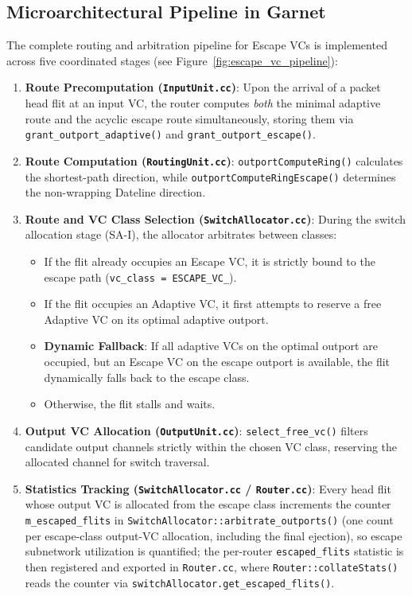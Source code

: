 \documentclass[10pt,journal,compsoc]{IEEEtran}
\begin{document}
\subsection{Microarchitectural Pipeline in Garnet}
The complete routing and arbitration pipeline for Escape VCs is implemented across five coordinated stages (see Figure~\ref{fig:escape_vc_pipeline}):

\begin{enumerate}
    \item \textbf{Route Precomputation (\texttt{InputUnit.cc})}:
    Upon the arrival of a packet head flit at an input VC, the router computes \textit{both} the minimal adaptive route and the acyclic escape route simultaneously, storing them via \texttt{grant\_outport\_adaptive()} and \texttt{grant\_outport\_escape()}.
    
    \item \textbf{Route Computation (\texttt{RoutingUnit.cc})}:
    \texttt{outportComputeRing()} calculates the shortest-path direction, while \texttt{outportComputeRingEscape()} determines the non-wrapping Dateline direction.
    
    \item \textbf{Route and VC Class Selection (\texttt{SwitchAllocator.cc})}:
    During the switch allocation stage (SA-I), the allocator arbitrates between classes:
    \begin{itemize}
        \item If the flit already occupies an Escape VC, it is strictly bound to the escape path (\texttt{vc\_class = ESCAPE\_VC\_}).
        \item If the flit occupies an Adaptive VC, it first attempts to reserve a free Adaptive VC on its optimal adaptive outport.
        \item \textbf{Dynamic Fallback}: If all adaptive VCs on the optimal outport are occupied, but an Escape VC on the escape outport is available, the flit dynamically falls back to the escape class.
        \item Otherwise, the flit stalls and waits.
    \end{itemize}
    
    \item \textbf{Output VC Allocation (\texttt{OutputUnit.cc})}:
    \texttt{select\_free\_vc()} filters candidate output channels strictly within the chosen VC class, reserving the allocated channel for switch traversal.
    
    \item \textbf{Statistics Tracking (\texttt{SwitchAllocator.cc} / \texttt{Router.cc})}:
    Every head flit whose output VC is allocated from the escape class increments the counter
    \texttt{m\_escaped\_flits} in \texttt{SwitchAllocator::arbitrate\_outports()} (one count per escape-class output-VC allocation, including the final ejection),
    so escape subnetwork utilization is quantified; the per-router \texttt{escaped\_flits} statistic is then
    registered and exported in \texttt{Router.cc}, where \texttt{Router::collateStats()} reads the counter
    via \texttt{switchAllocator.get\_escaped\_flits()}.
\end{enumerate}
\end{document}
